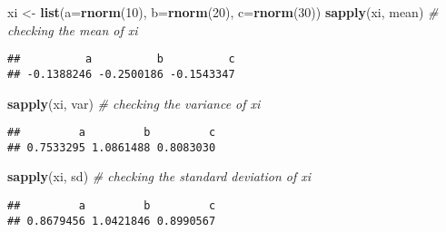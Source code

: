 \documentclass[
]{article}
\newenvironment{Shaded}{\begin{snugshade}}{\end{snugshade}}
\newcommand{\AttributeTok}[1]{\textcolor[rgb]{0.13,0.29,0.53}{#1}}
\newcommand{\CommentTok}[1]{\textcolor[rgb]{0.56,0.35,0.01}{\textit{#1}}}
\newcommand{\ConstantTok}[1]{\textcolor[rgb]{0.56,0.35,0.01}{#1}}
\newcommand{\DecValTok}[1]{\textcolor[rgb]{0.00,0.00,0.81}{#1}}
\newcommand{\DocumentationTok}[1]{\textcolor[rgb]{0.56,0.35,0.01}{\textbf{\textit{#1}}}}
\newcommand{\FunctionTok}[1]{\textcolor[rgb]{0.13,0.29,0.53}{\textbf{#1}}}
\newcommand{\NormalTok}[1]{#1}
\newcommand{\OtherTok}[1]{\textcolor[rgb]{0.56,0.35,0.01}{#1}}
\newcommand{\SpecialCharTok}[1]{\textcolor[rgb]{0.81,0.36,0.00}{\textbf{#1}}}
\begin{document}
\begin{Shaded}
\begin{Highlighting}[]
\NormalTok{xi }\OtherTok{\textless{}{-}} \FunctionTok{list}\NormalTok{(}\AttributeTok{a=}\FunctionTok{rnorm}\NormalTok{(}\DecValTok{10}\NormalTok{), }\AttributeTok{b=}\FunctionTok{rnorm}\NormalTok{(}\DecValTok{20}\NormalTok{), }\AttributeTok{c=}\FunctionTok{rnorm}\NormalTok{(}\DecValTok{30}\NormalTok{))}
\FunctionTok{sapply}\NormalTok{(xi, mean) }\CommentTok{\# checking the mean of xi}
\end{Highlighting}
\end{Shaded}

\begin{verbatim}
##          a          b          c 
## -0.1388246 -0.2500186 -0.1543347
\end{verbatim}

\begin{Shaded}
\begin{Highlighting}[]
\FunctionTok{sapply}\NormalTok{(xi, var) }\CommentTok{\# checking the variance of xi}
\end{Highlighting}
\end{Shaded}

\begin{verbatim}
##         a         b         c 
## 0.7533295 1.0861488 0.8083030
\end{verbatim}

\begin{Shaded}
\begin{Highlighting}[]
\FunctionTok{sapply}\NormalTok{(xi, sd) }\CommentTok{\# checking the standard deviation of xi}
\end{Highlighting}
\end{Shaded}

\begin{verbatim}
##         a         b         c 
## 0.8679456 1.0421846 0.8990567
\end{verbatim}

\begin{Shaded}
\end{Shaded}
\end{document}
